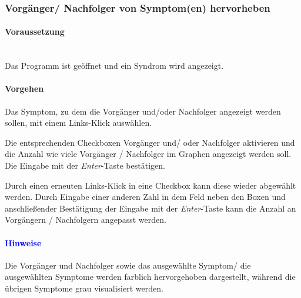 \documentclass[enabledeprecatedfontcommands,fontsize=11pt,paper=a4,twoside]{scrartcl}
\newcounter{one}
\newcounter{two}[one]
\newcommand*{\hint}{\paragraph{\textcolor{blue}{Hinweise}}}
\newcommand*{\condition}{\paragraph{Voraussetzung}$\;$ \vspace{0.2cm}\\}
\newcommand*{\action}{\paragraph{Vorgehen}}
\let\tempone\itemize
\let\temptwo\enditemize
\renewenvironment{itemize}{\tempone\addtolength{\itemsep}{-10.0pt}}{\temptwo}
\let\origenumerate\enumerate
\let\origendenumerate\endenumerate
\renewenvironment{enumerate}{\origenumerate \addtolength{\itemsep}{-10.0pt}}{\origendenumerate}
\begin{document}
\subsubsection{Vorgänger/ Nachfolger von Symptom(en) hervorheben}
	\condition 
		Das Programm ist geöffnet und ein Syndrom wird angezeigt.
	\action
	\begin{enumerate}
		\item Das Symptom, zu dem die Vorgänger und/oder Nachfolger angezeigt werden sollen, mit einem Links-Klick auswählen.
		\item Die entsprechenden Checkboxen Vorgänger und/ oder Nachfolger aktivieren und die Anzahl wie viele Vorgänger / Nachfolger im Graphen angezeigt werden soll. Die Eingabe mit der \textit{Enter}-Taste bestätigen.
		\item Durch einen erneuten Links-Klick in eine Checkbox kann diese wieder abgewählt werden. Durch Eingabe einer anderen Zahl in dem Feld neben den Boxen und anschließender Bestätigung der Eingabe mit der \textit{Enter}-Taste kann die Anzahl an Vorgängern / Nachfolgern angepasst werden.
	\end{enumerate} 
	\hint
	\begin{itemize}
		\item Die Vorgänger und Nachfolger sowie das ausgewählte Symptom/ die ausgewählten Symptome werden farblich hervorgehoben dargestellt, während die übrigen Symptome grau visualisiert werden. \\
	\end{itemize}

\newpage
\end{document}

